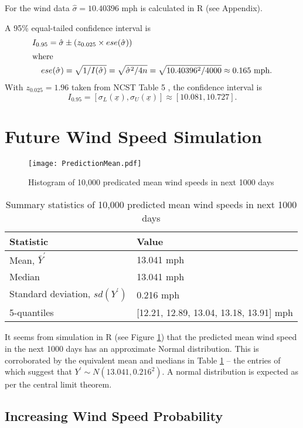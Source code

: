 \documentclass[11pt]{article}
\begin{document}
For the wind data $ \hat\sigma = 10.40396 \text{ mph}$ is calculated in R (see Appendix).

A 95\% equal-tailed confidence interval is
\begin{align*}
    I_{0.95} = \hat\sigma &\pm \left(z_{0.025} \times ese(\hat\sigma)\right) \\
\intertext{where}
    ese(\hat\sigma) &= \sqrt{1/I(\hat\sigma)} = \sqrt{\hat\sigma^2/4n} = \sqrt{10.40396^2 / 4000} \approx 0.165 \text{ mph.}
\end{align*}
With $z_{0.025} = 1.96$ taken from NCST Table 5 \cite{NCST}, the confidence interval is
$$ I_{0.95} = [\sigma_L(\underline{x}), \sigma_U(\underline{x})] \approx [ 10.081 , 10.727 ] \text{.}$$

\section{Future Wind Speed Simulation}

\begin{figure}[ht]
    \centering
	\texttt{[image: PredictionMean.pdf]}
    \caption{Histogram of 10,000 predicated mean wind speeds in next 1000 days}
    \label{fig:mean_hist}
\end{figure}

\begin{table}[ht]
    \centering
    \begin{tabular}{ll}
    Statistic & Value \\ \hline
    Mean, $\bar Y^\prime$ \rule{0pt}{3ex} & 13.041 mph \\
    Median & 13.041 mph \\
    Standard deviation, $sd(Y^\prime)$ & 0.216 mph \\
    5-quantiles & [12.21, 12.89, 13.04, 13.18, 13.91] mph
    \end{tabular}
    \caption{Summary statistics of 10,000 predicted mean wind speeds in next 1000 days}
    \label{t:mean}
\end{table}

It seems from simulation in R (see Figure \ref{fig:mean_hist}) that the predicted mean
wind speed in the next 1000 days has an approximate Normal distribution.
This is corroborated by the equivalent mean and medians in Table
\ref{t:mean} -- the entries of which suggest that
$Y^\prime \sim N(13.041, 0.216^2)$. A normal distribution is expected as
per the central limit theorem.

\subsection{Increasing Wind Speed Probability}
\end{document}
